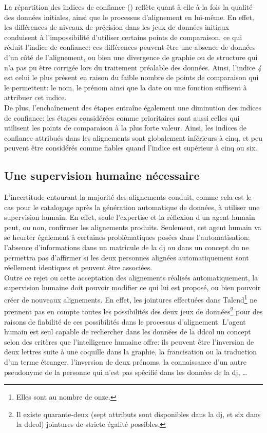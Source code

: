 La répartition des indices de confiance () reflète quant à elle à la fois la qualité des données initiales, ainsi que le processus d'alignement en lui-même. En effet, les différences de niveaux de précision dans les jeux de données initiaux conduisent à l'impossibilité d'utiliser certains points de comparaison, ce qui réduit l'indice de confiance: ces différences peuvent être une absence de données d'un côté de l'alignement, ou bien une divergence de graphie ou de structure qui n'a pas pu être corrigée lors du traitement préalable des données. Ainsi, l'indice \textit{4} est celui le plus présent en raison du faible nombre de points de comparaison qui le permettent: le nom, le prénom ainsi que la date ou une fonction suffisent à attribuer cet indice.\\

De plus, l'enchaînement des étapes entraîne également une diminution des indices de confiance: les étapes considérées comme prioritaires sont aussi celles qui utilisent les points de comparaison à la plus forte valeur. Ainsi, les indices de confiance attribués dans les alignements sont globalement inférieurs à cinq, et peu peuvent être considérés comme fiables quand l'indice est supérieur à cinq ou six.

\subsection{\label{III-C-3-b}Une supervision humaine nécessaire}

L'incertitude entourant la majorité des alignements conduit, comme cela est le cas pour le catalogage après la génération automatique de données, à utiliser une supervision humain. En effet, seule l'expertise et la réflexion d'un agent humain peut, ou non, confirmer les alignements produits. Seulement, cet agent humain va se heurter également à certaines problématiques posées dans l'automatisation: l'absence d'informations dans un matricule de la \ac{dj} ou dans un concept du \ldd ne permettra pas d'affirmer si les deux personnes alignées automatiquement sont réellement identiques et peuvent être associées.\\

Outre ce rejet ou cette acceptation des alignements réalisés automatiquement, la supervision humaine doit pouvoir modifier ce qui lui est proposé, ou bien pouvoir créer de nouveaux alignements. En effet, les jointures effectuées dans Talend\footnote{Elles sont au nombre de onze.} ne prennent pas en compte toutes les possibilités des deux jeux de données\footnote{Il existe quarante-deux (sept attributs sont disponibles dans la \ac{dj}, et six dans la \ac{ddcol}) jointures de stricte égalité possibles.} pour des raisons de fiabilité de ces possibilités dans le processus d'alignement. L'agent humain est seul capable de rechercher dans les données de la \ac{ddcol} un concept selon des critères que l'intelligence humaine offre: ils peuvent être l'inversion de deux lettres suite à une coquille dans la graphie, la francisation ou la traduction d'un terme étranger, l'inversion de deux prénoms, la connaissance d'un autre pseudonyme de la personne qui n'est pas spécifié dans les données de la \ac{dj}, \dots

